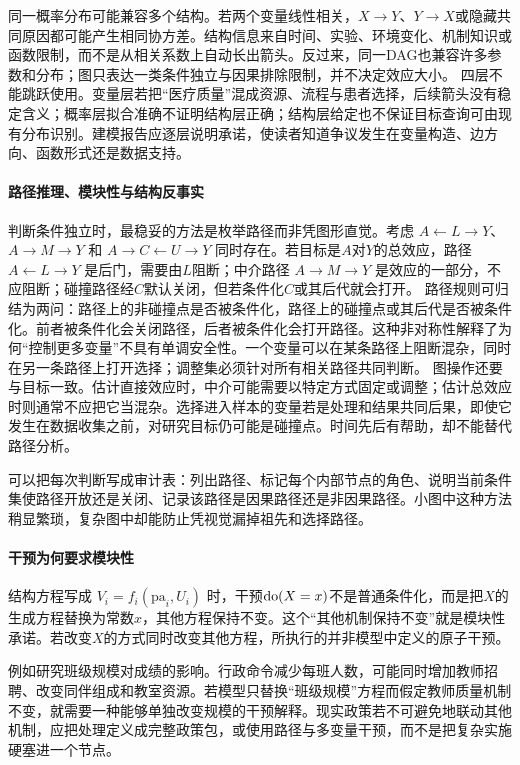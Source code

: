 同一概率分布可能兼容多个结构。若两个变量线性相关，$X\rightarrow Y$、$Y\rightarrow X$或隐藏共同原因都可能产生相同协方差。结构信息来自时间、实验、环境变化、机制知识或函数限制，而不是从相关系数上自动长出箭头。反过来，同一DAG也兼容许多参数和分布；图只表达一类条件独立与因果排除限制，并不决定效应大小。
四层不能跳跃使用。变量层若把“医疗质量”混成资源、流程与患者选择，后续箭头没有稳定含义；概率层拟合准确不证明结构层正确；结构层给定也不保证目标查询可由现有分布识别。建模报告应逐层说明承诺，使读者知道争议发生在变量构造、边方向、函数形式还是数据支持。

\paragraph{路径推理、模块性与结构反事实}

判断条件独立时，最稳妥的方法是枚举路径而非凭图形直觉。考虑 $A\leftarrow L\rightarrow Y$、$A\rightarrow M\rightarrow Y$ 和 $A\rightarrow C\leftarrow U\rightarrow Y$ 同时存在。若目标是$A$对$Y$的总效应，路径 $A\leftarrow L\rightarrow Y$ 是后门，需要由$L$阻断；中介路径 $A\rightarrow M\rightarrow Y$ 是效应的一部分，不应阻断；碰撞路径经$C$默认关闭，但若条件化$C$或其后代就会打开。
路径规则可归结为两问：路径上的非碰撞点是否被条件化，路径上的碰撞点或其后代是否被条件化。前者被条件化会关闭路径，后者被条件化会打开路径。这种非对称性解释了为何“控制更多变量”不具有单调安全性。一个变量可以在某条路径上阻断混杂，同时在另一条路径上打开选择；调整集必须针对所有相关路径共同判断。
图操作还要与目标一致。估计直接效应时，中介可能需要以特定方式固定或调整；估计总效应时则通常不应把它当混杂。选择进入样本的变量若是处理和结果共同后果，即使它发生在数据收集之前，对研究目标仍可能是碰撞点。时间先后有帮助，却不能替代路径分析。

可以把每次判断写成审计表：列出路径、标记每个内部节点的角色、说明当前条件集使路径开放还是关闭、记录该路径是因果路径还是非因果路径。小图中这种方法稍显繁琐，复杂图中却能防止凭视觉漏掉祖先和选择路径。

\paragraph{干预为何要求模块性}

结构方程写成 $V_i=f_i(\mathrm{pa}_i,U_i)$ 时，干预$\operatorname{do}(X=x)$不是普通条件化，而是把$X$的生成方程替换为常数$x$，其他方程保持不变。这个“其他机制保持不变”就是模块性承诺。若改变$X$的方式同时改变其他方程，所执行的并非模型中定义的原子干预。

例如研究班级规模对成绩的影响。行政命令减少每班人数，可能同时增加教师招聘、改变同伴组成和教室资源。若模型只替换“班级规模”方程而假定教师质量机制不变，就需要一种能够单独改变规模的干预解释。现实政策若不可避免地联动其他机制，应把处理定义成完整政策包，或使用路径与多变量干预，而不是把复杂实施硬塞进一个节点。


